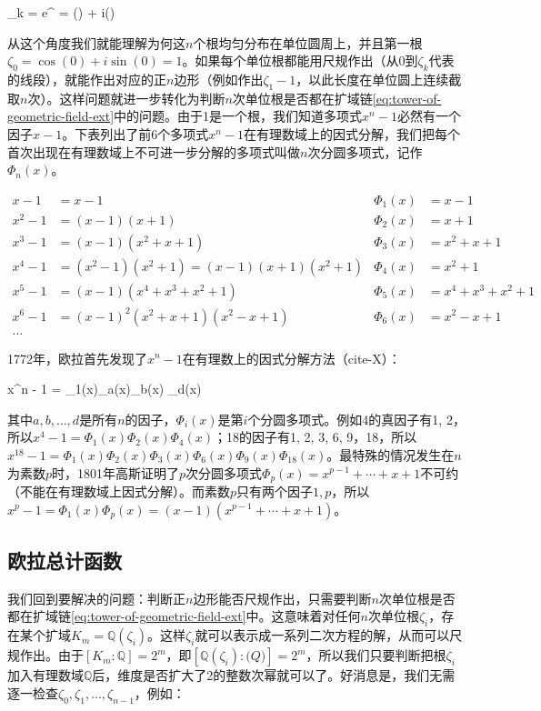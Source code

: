 \be
\zeta_k = e^{} = \cos() + i\sin()
\ee

从这个角度我们就能理解为何这$n$个根均匀分布在单位圆周上，并且第一根$\zeta_0 = \cos(0) + i\sin(0) = 1$。如果每个单位根都能用尺规作出（从0到$\zeta_k$代表的线段），就能作出对应的正$n$边形（例如作出$\zeta_1 - 1$，以此长度在单位圆上连续截取$n$次）。这样问题就进一步转化为判断$n$次单位根是否都在扩域链\cref{eq:tower-of-geometric-field-ext}中的问题。由于1是一个根，我们知道多项式$x^n - 1$必然有一个因子$x - 1$。下表列出了前6个多项式$x^n - 1$在有理数域上的因式分解，我们把每个首次出现在有理数域上不可进一步分解的多项式叫做$n$次分圆多项式，记作$\Phi_n(x)$。

\begin{align*}
x - 1 &= x - 1 & \Phi_1(x) &= x - 1 \\
x^2 - 1 &= (x - 1)(x + 1) & \Phi_2(x) &= x + 1 \\
x^3 - 1 &= (x - 1)(x^2 + x + 1) & \Phi_3(x) &= x^2 + x + 1 \\
x^4 - 1 &= (x^2 - 1)(x^2 + 1) = (x - 1)(x + 1)(x^2 + 1) & \Phi_4(x) &= x^2 + 1 \\
x^5 - 1 &= (x - 1)(x^4 + x^3 + x^2 + 1) & \Phi_5(x) &= x^4 + x^3 + x^2 + 1 \\
x^6 - 1 &= (x - 1)^2(x^2 + x + 1)(x^2 - x + 1) & \Phi_6(x) &= x^2 - x + 1 \\
\dotso
\end{align*}

1772年，欧拉首先发现了$x^n - 1$在有理数上的因式分解方法（cite-X）：

\be
x^n - 1 = \Phi_1(x)\Phi_a(x)\Phi_b(x) \dotsm \Phi_d(x)
\ee

其中$a, b, \dotsc, d$是所有$n$的因子，$\Phi_i(x)$是第$i$个分圆多项式。例如4的真因子有1, 2，所以$x^4 - 1 = \Phi_1(x)\Phi_2(x)\Phi_4(x)$；18的因子有1, 2, 3, 6, 9，18，所以$x^{18} - 1 = \Phi_1(x)\Phi_2(x)\Phi_3(x)\Phi_6(x)\Phi_9(x)\Phi_{18}(x)$。最特殊的情况发生在$n$为素数$p$时，1801年高斯证明了$p$次分圆多项式$\Phi_p(x) = x^{p-1} + \dotsb + x + 1$不可约（不能在有理数域上因式分解）。而素数$p$只有两个因子$1, p$，所以$x^p - 1 = \Phi_1(x)\Phi_p(x) = (x - 1)(x^{p-1} + \dotsb + x + 1)$。

\subsection{欧拉总计函数}
我们回到要解决的问题：判断正$n$边形能否尺规作出，只需要判断$n$次单位根是否都在扩域链\cref{eq:tower-of-geometric-field-ext}中。这意味着对任何$n$次单位根$\zeta_i$，存在某个扩域$K_m = \mathbb{Q}(\zeta_i)$。这样$\zeta_i$就可以表示成一系列二次方程的解，从而可以尺规作出。由于$[K_m : \mathbb{Q}] = 2^m$，即$[\mathbb{Q}(\zeta_i) : \mathbb(Q)] = 2^m$，所以我们只要判断把根$\zeta_i$加入有理数域$\mathbb{Q}$后，维度是否扩大了2的整数次幂就可以了。好消息是，我们无需逐一检查$\zeta_0, \zeta_1, \dotsc, \zeta_{n-1}$，例如：

